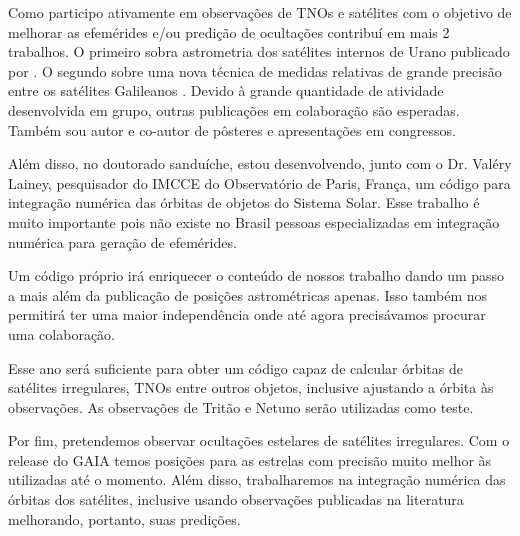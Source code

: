 \documentclass[12pt,a4paper]{report}
\begin{document}
Como participo ativamente em observações de TNOs e satélites com o objetivo de melhorar as efemérides e/ou predição de ocultações contribuí em mais 2 trabalhos. O primeiro sobra astrometria dos satélites internos de Urano publicado por \cite{Camargo2015}. O segundo sobre uma nova técnica de medidas relativas de grande precisão entre os satélites Galileanos \citep{Morgado2016}. Devido à grande quantidade de atividade desenvolvida em grupo, outras publicações em colaboração são esperadas. Também sou autor e co-autor de pôsteres e apresentações em congressos.

Além disso, no doutorado sanduíche, estou desenvolvendo, junto com o Dr. Valéry Lainey, pesquisador do IMCCE do Observatório de Paris, França, um código para integração numérica das órbitas de objetos do Sistema Solar. Esse trabalho é muito importante pois não existe no Brasil pessoas especializadas em integração numérica para geração de efemérides.

Um código próprio irá enriquecer o conteúdo de nossos trabalho dando um passo a mais além da publicação de posições astrométricas apenas. Isso também nos permitirá ter uma maior independência onde até agora precisávamos procurar uma colaboração.

Esse ano será suficiente para obter um código capaz de calcular órbitas de satélites irregulares, TNOs entre outros objetos, inclusive ajustando a órbita às observações. As observações de Tritão e Netuno serão utilizadas como teste.

Por fim, pretendemos observar ocultações estelares de satélites irregulares. Com o release do GAIA temos posições para as estrelas com precisão muito melhor às utilizadas até o momento. Além disso, trabalharemos na integração numérica das órbitas dos satélites, inclusive usando observações publicadas na literatura melhorando, portanto, suas predições.

\newpage


\end{document}
